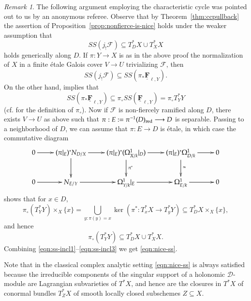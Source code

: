 \documentclass[twoside]{amsart}
\newcommand{\FF}{\mathbf{F}}
\newcommand{\Ff}{\mathscr{F}}
\newcommand{\isom}{\simeq}
\renewcommand{\to}{\longrightarrow}
\theoremstyle{plain}
\theoremstyle{definition}
\theoremstyle{remark}
\newtheorem{remark}[subsubsection]{Remark}
\numberwithin{equation}{subsection}
\begin{document}
\begin{remark} \label{rmk:nonfierce-through-char-cycle}
	The following argument employing the characteristic cycle was pointed out to us by an anonymous referee. Observe that by Theorem~\ref{thm:ccpullback} the assertion of Proposition~\ref{prop:nonfierce-is-nice} holds under the weaker assumption that
	\begin{equation} \label{eqn:nice-ss}
		SS(j_! \Ff) \subseteq T^*_D X \cup T^*_X X
	\end{equation}
	holds generically along $D$. If $\pi:Y\to X$ is as in the above proof the normalization of $X$ in a finite \'etale Galois cover $V\to U$ trivializing $\Ff$, then
	\begin{equation} \label{eqn:ss-incl1}
		SS(j_! \Ff) \subseteq SS(\pi_* \underline{\FF}_{\ell,Y}).  
	\end{equation}
	On the other hand, \cite[Lemma~4.2.6]{Saito2016} implies that 
	\begin{equation} \label{eqn:ss-incl2}
		SS(\pi_* \underline{\FF}_{\ell,Y}) \subseteq \pi_\circ SS(\underline{\FF}_{\ell,Y}) = \pi_\circ T^*_Y Y
	\end{equation}
	(cf. \cite[Definition~3.7]{Saito2016} for the definition of $\pi_\circ$). Now if $\Ff$ is non-fiercely ramified along $D$, there exists $V\to U$ as above such that $\pi: E:=\pi^{-1}(D)_{\rm red}\to D$ is separable. Passing to a neighborhood of $D$, we can assume that $\pi:E\to D$ is \'etale, in which case the commutative diagram
	\[ 
		\xymatrix{
			0\ar[r] & (\pi|_{E})^* N_{D/X} \ar[d] \ar[r] & (\pi|_{E})^* (\Omega^1_{X/k}|_D) \ar[d]^{\pi^*} \ar[r] & (\pi|_{E})^* \Omega^1_{D/k} \ar[d]^\isom \ar[r] & 0 \\
			0\ar[r] & N_{E/Y} \ar[r] & \Omega^1_{Y/k}|_{E} \ar[r] & \Omega^1_{E/k} \ar[r] & 0 
		}
	\]
	shows that for $x\in D$,
	\[ \pi_\circ (T^*_Y Y)\times_X \{x\} = \bigcup_{y\colon \pi(y)=x} \ker(\pi^*: T^*_x X \to T^*_y Y) \subseteq T^*_D X \times_X \{x\}, 
	\]
	and hence 
	\begin{equation} \label{eqn:ss-incl3}
		\pi_\circ(T^*_Y Y) \subseteq T^*_D X\cup T^*_X X. 
	\end{equation}
	Combining \eqref{eqn:ss-incl1}--\eqref{eqn:ss-incl3} we get \eqref{eqn:nice-ss}.

	Note that in the classical complex analytic setting \eqref{eqn:nice-ss} is always satisfied because the irreducible components of the singular support of a holonomic $\mathscr{D}$-module are Lagrangian subvarieties of $T^* X$, and hence are the closures in $T^* X$ of conormal bundles $T^*_Z X$ of smooth locally closed subschemes $Z\subseteq X$.  
\end{remark}
\end{document}
